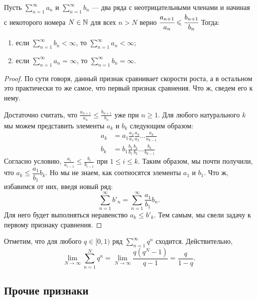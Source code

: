 \documentclass[a4paper, 12pt]{article}
\begin{document}
\begin{Test}
	Пусть $\sum\limits_{n=1}^{\infty} a_n$ и $\sum\limits_{n=1}^{\infty} b_n$ --- два ряда с неотрицательными членами и начиная с некоторого номера $N\in\mathbb{N}$ для всех $n>N$ верно $\cfrac{a_{n+1}}{a_n} \leqslant \cfrac{b_{n+1}}{b_n}$ Тогда: \begin{enumerate}
		\item если $\sum\limits_{n=1}^{\infty} b_n < \infty$, то $\sum\limits_{n=1}^{\infty} a_n < \infty$;
		\item если $\sum\limits_{n=1}^{\infty} a_n = \infty$, то $\sum\limits_{n=1}^{\infty} b_n = \infty$. 
	\end{enumerate}
\end{Test}
\begin{proof}
	По сути говоря, данный признак сравнивает скорости роста, а в остальном это практически то же самое, что первый признак сравнения. Что ж, сведем его к нему.
	
	Достаточно считать, что $\frac{a_{n+1}}{a_n} \leqslant \frac{b_{n+1}}{b_n}$ уже при $n \ge 1$. Для любого натурального $k$ мы можем представить элементы $a_k$ и $b_k$ следующим образом:
	\begin{align*}
	a_k &= a_1 \frac{a_2}{a_1}\frac{a_3}{a_2} \ldots \frac{a_k}{a_{k-1}} \\
	b_k &= b_1 \frac{b_2}{b_1}\frac{b_3}{b_2} \ldots \frac{b_k}{b_{k-1}}
	\end{align*}
	Согласно условию, $\frac{a_{i}}{a_{i-1}} \le \frac{b_i}{b_{i-1}}$ при $1 \le i \le k$. Таким образом, мы почти получили, что $a_k \le \dfrac{a_1}{b_1}b_k$. Но мы не знаем, как соотносятся элементы $a_1$ и $b_1$. Что ж, избавимся от них, введя новый ряд:
	$$
	\sum\limits_{n=1}^{\infty} b'_n = \sum\limits_{n=1}^{\infty}\frac{a_1}{b_1}b_n.
	$$ 
	Для него будет выполняться неравенство $a_k \le b'_k$. Тем самым, мы свели задачу к первому признаку сравнения.
\end{proof}

\begin{Comment}
	Отметим, что для любого $q \in [0,1)$ ряд $\sum\limits_{n=1}^{\infty} q^n$ сходится. Действительно, $$\lim\limits_{N\rightarrow\infty} \sum\limits_{n=1}^{N} q^n=\lim\limits_{N\rightarrow\infty}\frac{q(q^N-1)}{q-1} = \frac{q}{1-q}.$$
\end{Comment}

\subsection{Прочие признаки}
\end{document}
